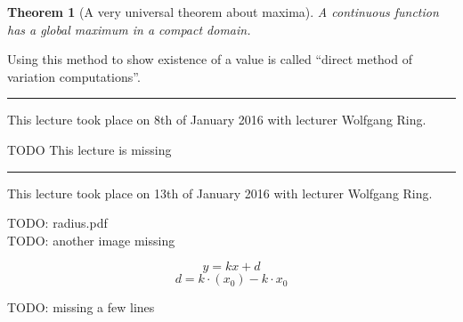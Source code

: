 \documentclass[a4paper,landscape,twocolumn]{article}
\newtheorem{theorem}{Theorem}
\newcommand\meta[3]{\hrule{} This #1 took place on #2 with lecturer #3.\par}
\begin{document}
\begin{theorem}[A very universal theorem about maxima]
  A continuous function has a global maximum in a compact domain.
\end{theorem}

Using this method to show existence of a value is called
\enquote{direct method of variation computations}.

\meta{lecture}{8th of January 2016}{Wolfgang Ring}

TODO This lecture is missing

\meta{lecture}{13th of January 2016}{Wolfgang Ring}

TODO: radius.pdf \\
TODO: another image missing

\[ y = kx + d \]
\[ d = k \cdot(x_0) - k \cdot x_0 \]

TODO: missing a few lines
\end{document}
